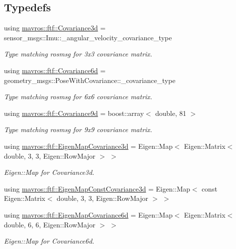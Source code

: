 \subsection*{Typedefs}
\begin{DoxyCompactItemize}
\item 
using \mbox{\hyperlink{group__nodelib_ga56776cc8f5410a6bfeafa085fcd6fe30}{mavros\+::ftf\+::\+Covariance3d}} = sensor\+\_\+msgs\+::\+Imu\+::\+\_\+angular\+\_\+velocity\+\_\+covariance\+\_\+type
\begin{DoxyCompactList}\small\item\em Type matching rosmsg for 3x3 covariance matrix. \end{DoxyCompactList}\item 
using \mbox{\hyperlink{group__nodelib_gadc24a922dd3f6a7ff0d7aed9bda42bca}{mavros\+::ftf\+::\+Covariance6d}} = geometry\+\_\+msgs\+::\+Pose\+With\+Covariance\+::\+\_\+covariance\+\_\+type
\begin{DoxyCompactList}\small\item\em Type matching rosmsg for 6x6 covariance matrix. \end{DoxyCompactList}\item 
using \mbox{\hyperlink{group__nodelib_ga6df3c37d3cd74b3e6919e734575bb9b7}{mavros\+::ftf\+::\+Covariance9d}} = boost\+::array$<$ double, 81 $>$
\begin{DoxyCompactList}\small\item\em Type matching rosmsg for 9x9 covariance matrix. \end{DoxyCompactList}\item 
using \mbox{\hyperlink{group__nodelib_gabafbfa3aa489d1c304f320a417ce91d1}{mavros\+::ftf\+::\+Eigen\+Map\+Covariance3d}} = Eigen\+::\+Map$<$ Eigen\+::\+Matrix$<$ double, 3, 3, Eigen\+::\+Row\+Major $>$ $>$
\begin{DoxyCompactList}\small\item\em Eigen\+::\+Map for Covariance3d. \end{DoxyCompactList}\item 
using \mbox{\hyperlink{group__nodelib_ga05212907ea66649136fdbe0ecea29224}{mavros\+::ftf\+::\+Eigen\+Map\+Const\+Covariance3d}} = Eigen\+::\+Map$<$ const Eigen\+::\+Matrix$<$ double, 3, 3, Eigen\+::\+Row\+Major $>$ $>$
\item 
using \mbox{\hyperlink{group__nodelib_ga5d26d0ee661868a02a4fd476856757e3}{mavros\+::ftf\+::\+Eigen\+Map\+Covariance6d}} = Eigen\+::\+Map$<$ Eigen\+::\+Matrix$<$ double, 6, 6, Eigen\+::\+Row\+Major $>$ $>$
\begin{DoxyCompactList}\small\item\em Eigen\+::\+Map for Covariance6d. \end{DoxyCompactList}\item 

\end{DoxyCompactItemize}
